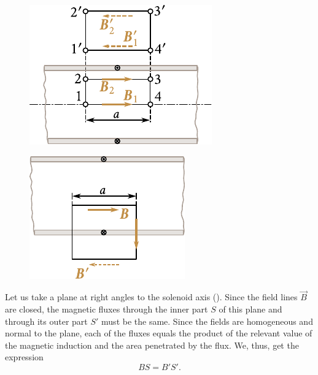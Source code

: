 \begin{figure}[t]
	\begin{minipage}[t]{0.48\linewidth}
		\begin{center}
			\includegraphics[scale=1]{figures/ch_06/fig_6_29.pdf}
			\caption[]{}
			\label{fig:6_29}
		\end{center}
	\end{minipage}
	\hfill{ }%
	\begin{minipage}[t]{0.48\linewidth}
		\begin{center}
			\includegraphics[scale=1]{figures/ch_06/fig_6_30.pdf}
			\caption[]{}
			\label{fig:6_30}
		\end{center}
	\end{minipage}
\vspace{-0.4cm}
\end{figure}

Let us take a plane at right angles to the solenoid axis (). Since the field lines $\vec{B}$ are closed, the magnetic fluxes through the inner part $S$ of this plane and through its outer part $S'$ must be the same. Since the fields are homogeneous and normal to the plane, each of the fluxes equals the product of the relevant value of the magnetic induction and the area penetrated by the flux. We, thus, get the expression
\begin{equation*}
    BS = B'S'.
\end{equation*}

